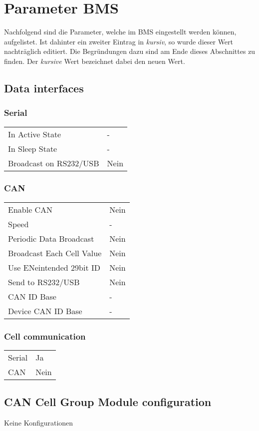 \chapter{Parameter BMS}\label{anh_bms}
\newpage
Nachfolgend sind die Parameter, welche im BMS eingestellt werden können, aufgelistet. Ist dahinter ein zweiter Eintrag in \textit{kursiv}, so wurde dieser Wert nachträglich editiert. Die Begründungen dazu sind am Ende dieses Abschnittes zu finden. Der \textit{kursive} Wert bezeichnet dabei den neuen Wert.
\section*{Data interfaces}
\subsection*{Serial}
\begin{tabular}{p{11cm}p{2cm}}
	In Active State & - \\
	In Sleep State & - \\
	Broadcast on RS232/USB & Nein
\end{tabular}

\subsection*{CAN}
\begin{tabular}{p{11cm}p{2cm}}
	Enable CAN & Nein \\
	Speed & - \\
	Periodic Data Broadcast & Nein \\
	Broadcast Each Cell Value & Nein \\
	Use ENeintended 29bit ID & Nein \\
	Send to RS232/USB & Nein \\
	CAN ID Base & - \\
	Device CAN ID Base & -
\end{tabular}

\subsection*{Cell communication}
\begin{tabular}{p{11cm}p{2cm}}
	Serial & Ja \\
	CAN & Nein
\end{tabular}

\section*{CAN Cell Group Module configuration}
Keine Konfigurationen \newpage

